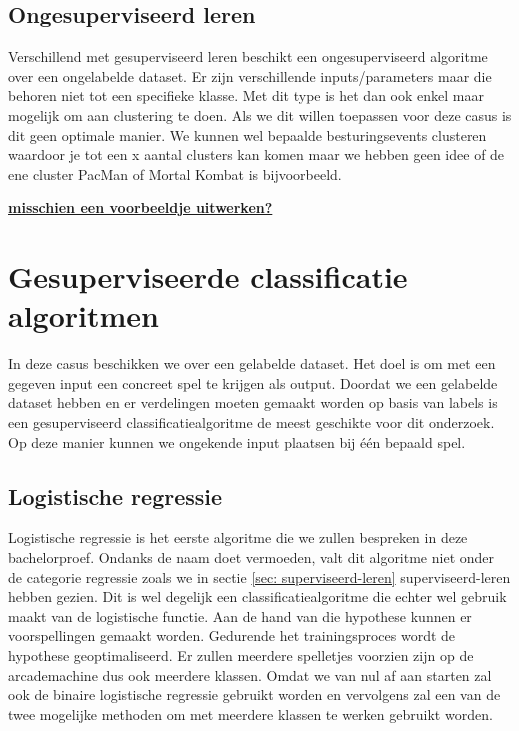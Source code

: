 \subsection*{Ongesuperviseerd leren}
\label{sec: ongesuperviseerd-leren}
Verschillend met gesuperviseerd leren beschikt een ongesuperviseerd algoritme over een ongelabelde dataset. Er zijn verschillende inputs/parameters maar die behoren niet tot een specifieke klasse. Met dit type is het dan ook enkel maar mogelijk om aan clustering te doen. Als we dit willen toepassen voor deze casus is dit geen optimale manier. We kunnen wel bepaalde besturingsevents clusteren waardoor je tot een x aantal clusters kan komen maar we hebben geen idee of de ene cluster PacMan of Mortal Kombat is bijvoorbeeld. 


\textbf{\underline{{\Large misschien een voorbeeldje uitwerken? }}}


\section{Gesuperviseerde classificatie algoritmen}
\label{sec:gesuperviseerde-classificatie-algoritmen}

In deze casus beschikken we over een gelabelde dataset. Het doel is om met een gegeven input een concreet spel te krijgen als output. Doordat we een gelabelde dataset hebben en er verdelingen moeten gemaakt worden op basis van labels is een gesuperviseerd classificatiealgoritme de meest geschikte voor dit onderzoek. Op deze manier kunnen we ongekende input plaatsen bij één bepaald spel.


\subsection{Logistische regressie}
\label{sec:logistische-regressie}

Logistische regressie is het eerste algoritme die we zullen bespreken in deze bachelorproef. Ondanks de naam doet vermoeden, valt dit algoritme niet onder de categorie regressie zoals we in sectie \ref{sec: superviseerd-leren} superviseerd-leren hebben gezien. Dit is wel degelijk een classificatiealgoritme die echter wel gebruik maakt van de logistische functie. Aan de hand van die hypothese kunnen er voorspellingen gemaakt worden. Gedurende het trainingsproces wordt de hypothese geoptimaliseerd. Er zullen meerdere spelletjes voorzien zijn op de arcademachine dus ook meerdere klassen. Omdat we van nul af aan starten zal ook de binaire logistische regressie gebruikt worden en vervolgens zal een van de twee mogelijke methoden om met meerdere klassen te werken gebruikt worden. 

